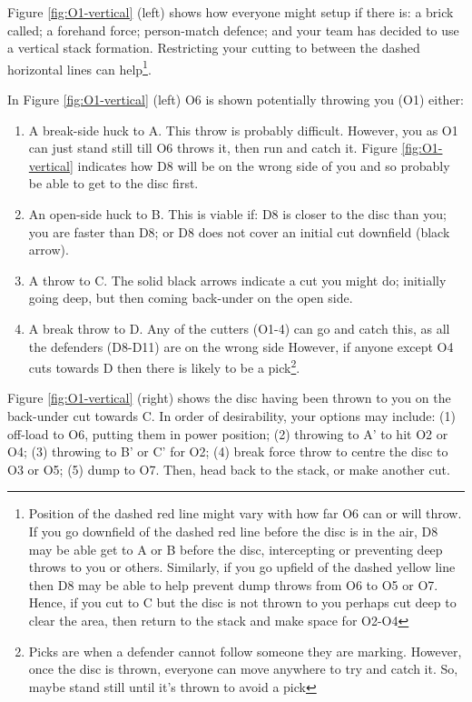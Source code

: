 \documentclass{tufte-handout}
\begin{document}
Figure \ref{fig:O1-vertical} (left) shows 
how everyone might 
setup 
if there is: 
a brick called;
a forehand force; 
person-match defence; 
and your team has decided to use 
a vertical stack formation.
Restricting your cutting 
to between 
the dashed 
horizontal 
lines 
can help\footnote{
Position of 
the dashed red line might vary
with how far O6 
can or will 
throw. 
If you go 
downfield of the dashed red line 
before the disc is in the air,
D8 may be able 
get to
A or B 
before the disc,
intercepting 
or preventing 
deep throws to 
you or others. 
Similarly, 
if you go 
upfield of the dashed yellow line
then D8 may 
be able to help
prevent dump throws from O6
to O5 
or O7.
Hence,
if you cut to C
but the disc is not thrown to you
perhaps cut deep 
to clear the area, 
then return to the stack
and make space for O2-O4}. 

In Figure \ref{fig:O1-vertical} (left)
O6 is shown
potentially throwing 
you (O1) either:
\begin{enumerate}
\item A break-side 
huck to A.
This throw is 
probably 
difficult. 
However, you as O1
can just
stand still 
till O6 throws it, 
then run and catch it.
Figure \ref{fig:O1-vertical} indicates how 
D8 will be on the wrong side of you
and so probably 
be able to get to the disc
first.
\item An open-side huck to B. 
This is viable if: 
D8 is closer to the disc than you; 
you are faster than D8; or 
D8 does not cover 
an initial cut downfield (black arrow). 
\item A throw 
to C.
The solid black arrows indicate 
a cut you might do;
initially going deep,
but then coming back-under
on the open side. 


\item A break throw to D. 
Any of the cutters 
(O1-4)
can go and catch this, 
as all the defenders 
(D8-D11) 
are on the wrong side
However,
if anyone 
except O4 
cuts towards D 
then there is likely 
to be a pick\footnote{
Picks are
when a defender 
cannot follow 
someone they are marking.  
However, 
once the disc is thrown,
everyone can move anywhere 
to try and catch it. 
So, maybe stand still 
until it's thrown 
to avoid a pick}.
\end{enumerate}

Figure \ref{fig:O1-vertical} (right) shows 
the disc having been thrown to you
on the back-under cut towards C. 
In order of desirability, 
your options may include: 
(1)
off-load to O6, 
putting them in power position;
(2) throwing to A' to hit O2 or O4;
(3) throwing to B' or C' for O2;
(4) break force throw 
to centre the disc
to O3 or O5;
(5) dump to O7.
Then, head back to the stack, 
or make another cut.
\end{document}
